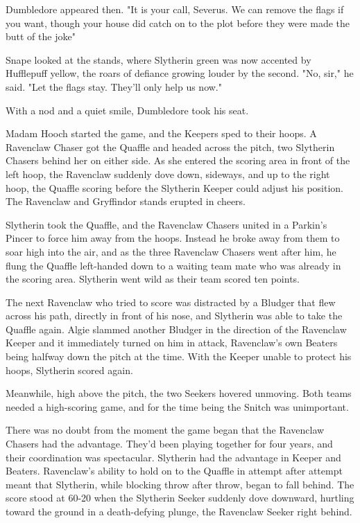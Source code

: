 Dumbledore appeared then. "It is your call, Severus. We can remove the flags if you want, though your house did catch on to the plot before they were made the butt of the joke{\el}"

Snape looked at the stands, where Slytherin green was now accented by Hufflepuff yellow, the roars of defiance growing louder by the second. "No, sir," he said. "Let the flags stay. They'll only help us now."

With a nod and a quiet smile, Dumbledore took his seat.

Madam Hooch started the game, and the Keepers sped to their hoops. A Ravenclaw Chaser got the Quaffle and headed across the pitch, two Slytherin Chasers behind her on either side. As she entered the scoring area in front of the left hoop, the Ravenclaw suddenly dove down, sideways, and up to the right hoop, the Quaffle scoring before the Slytherin Keeper could adjust his position. The Ravenclaw and Gryffindor stands erupted in cheers.

Slytherin took the Quaffle, and the Ravenclaw Chasers united in a Parkin's Pincer to force him away from the hoops. Instead he broke away from them to soar high into the air, and as the three Ravenclaw Chasers went after him, he flung the Quaffle left-handed down to a waiting team mate who was already in the scoring area. Slytherin went wild as their team scored ten points.

The next Ravenclaw who tried to score was distracted by a Bludger that flew across his path, directly in front of his nose, and Slytherin was able to take the Quaffle again. Algie slammed another Bludger in the direction of the Ravenclaw Keeper and it immediately turned on him in attack, Ravenclaw's own Beaters being halfway down the pitch at the time. With the Keeper unable to protect his hoops, Slytherin scored again.

Meanwhile, high above the pitch, the two Seekers hovered unmoving. Both teams needed a high-scoring game, and for the time being the Snitch was unimportant.

There was no doubt from the moment the game began that the Ravenclaw Chasers had the advantage. They'd been playing together for four years, and their coordination was spectacular. Slytherin had the advantage in Keeper and Beaters. Ravenclaw's ability to hold on to the Quaffle in attempt after attempt meant that Slytherin, while blocking throw after throw, began to fall behind. The score stood at 60-20 when the Slytherin Seeker suddenly dove downward, hurtling toward the ground in a death-defying plunge, the Ravenclaw Seeker right behind.

